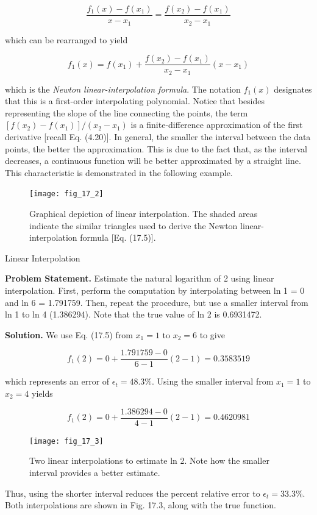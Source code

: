 \documentclass[../main.tex]{subfiles}
\begin{document}
\begin{equation}
	\tag{17.4}
	\frac{f_1(x)-f(x_1)}{x - x_1} = \frac{f(x_2) - f(x_1)}{x_2 - x_1}
\end{equation}

\noindent which can be rearranged to yield

\begin{equation}
	\tag{17.5}
	f_1(x) = f(x_1) + \frac{f(x_2) - f(x_1)}{x_2 - x_1} (x - x_1)
\end{equation}

\noindent which is the \textit{Newton linear-interpolation formula}. The notation $f_1 (x)$ designates that this
is a first-order interpolating polynomial. Notice that besides representing the slope of the
line connecting the points, the term $[f(x_2) - f(x_1)]/(x_2 - x_1)$ is a finite-difference approximation of the first derivative [recall Eq. (4.20)]. In general, the smaller the interval
between the data points, the better the approximation. This is due to the fact that, as the
interval decreases, a continuous function will be better approximated by a straight line.
This characteristic is demonstrated in the following example.

\begin{figure}[H] 
	\centering
	\texttt{[image: fig\_17\_2]}
	\caption{\textsf{Graphical depiction of linear interpolation. The shaded areas indicate the similar triangles used
	to derive the Newton linear-interpolation formula [Eq. (17.5)].}}
	\label{fig:fig_17_2}
\end{figure}

\begin{example} Linear Interpolation

	\noindent \textbf{Problem Statement. } \quad Estimate the natural logarithm of 2 using linear interpolation. First,
	perform the computation by interpolating between ln 1 = 0 and ln 6 = 1.791759. Then,
	repeat the procedure, but use a smaller interval from ln 1 to ln 4 (1.386294). Note that the
	true value of ln 2 is 0.6931472.

	\noindent \textbf{Solution.} \quad We use Eq. (17.5) from $x_1 = 1$ to $x_2 = 6$ to give

	$$
		f_1 (2) = 0 + \frac{1.791759 - 0}{6 - 1} (2 - 1) = 0.3583519
	$$
	
	\noindent which represents an error of $\epsilon_t = 48.3\%$. Using the smaller interval from $x_1 = 1$ to $x_2 = 4$
	yields

	$$
		f_1 (2) = 0 + \frac{1.386294 - 0}{4 - 1} (2 - 1) = 0.4620981
	$$

	\begin{figure}[H] 
		\centering
		\texttt{[image: fig\_17\_3]}
		\caption{\textsf{Two linear interpolations to estimate ln 2. Note how the smaller interval provides a better
		estimate.}}
		\label{fig:fig_17_3}
	\end{figure}

	\noindent Thus, using the shorter interval reduces the percent relative error to $\epsilon_t = 33.3\%$. Both
	interpolations are shown in Fig. 17.3, along with the true function.

\end{example}
\end{document}
